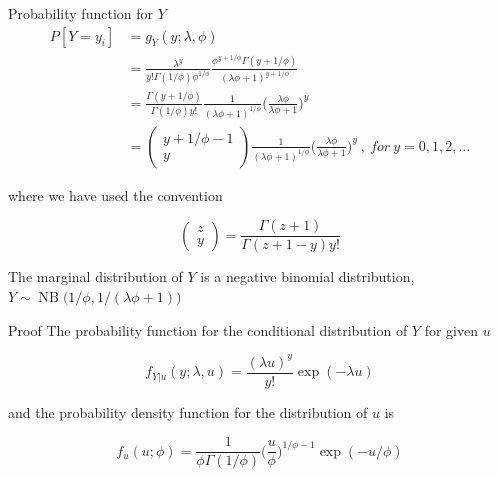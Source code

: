 \documentclass[aspectratio=169]{beamer}
\DeclareMathOperator{\NB}{NB}
\begin{document}
\begin{frame}{Probability function for \(Y\)}
\begin{equation} \label{eq:pdfMix}
  \begin{aligned}
    P[Y=y_i]&=g_{Y}(y;\lambda, \phi) \\
    &=\frac{\lambda^{y}}{y!\Gamma(1/\phi)\phi^{1/\phi}}\frac{\phi^{y+1/\phi}\Gamma(y+1/\phi)}{(\lambda \phi + 1)^{y+1/\phi}} \\
    &=\frac{\Gamma(y+1/\phi)}{\Gamma(1/\phi)y!}\frac{1}{(\lambda\phi+1)^{1/\phi}}\bigg(\frac{\lambda\phi}{\lambda\phi+1}\bigg)^{y} \\
    &=\begin{pmatrix} y+1/\phi-1 \\ y \end{pmatrix} \frac{1}{(\lambda\phi+1)^{1/\phi}}\bigg(\frac{\lambda\phi}{\lambda\phi+1}\bigg)^{y} \ , \ for \ y = 0, 1, 2, \dots
  \end{aligned}
\end{equation}

where we have used the convention

\begin{equation}
  \begin{pmatrix} z\\y \end{pmatrix} = \frac{\Gamma(z+1)}{\Gamma(z+1-y)y!}
\end{equation}

The marginal distribution of \(Y\) is a negative binomial distribution,
\(Y\sim \NB\big(1/\phi,1/(\lambda \phi+1)\big)\)
\end{frame}

\begin{frame}{Proof}
\protect\hypertarget{proof}{}
The probability function for the conditional distribution of \(Y\) for
given \(u\)

\begin{equation} \label{eq:pdfPois}
  f_{Y|u}(y;\lambda, u)=\frac{(\lambda u)^y}{y!} \exp (-\lambda u)
\end{equation}

and the probability density function for the distribution of \(u\) is

\begin{equation} \label{eq:pdfGamma}
  f_{u}(u;\phi)=\frac{1}{\phi \Gamma(1/\phi)} \bigg(\frac{u}{\phi}\bigg)^{1/\phi-1} \exp (-u/\phi)
\end{equation}
\end{frame}
\end{document}
